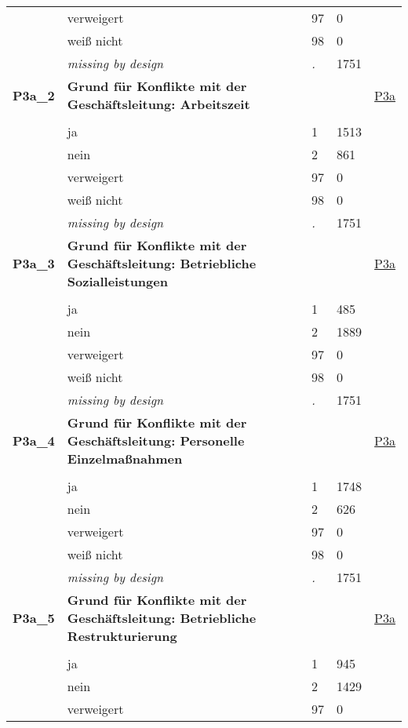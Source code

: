 \begin{longtable}{| L{2.65cm} | L{8cm} | C{1.5cm} | R{1.25cm} | C{2.25cm}  |}
   & verweigert & 97 & 0 &  \\ 
   & weiß nicht & 98 & 0 &  \\ 
   & \textit{missing by design} & \textit{.} & 1751 &  \\ 
   \midrule
\textbf{P3a\_2}\label{var:P3a:2} & \textbf{Grund für Konflikte mit der Geschäftsleitung: Arbeitszeit} &  &  & \hyperref[P3a]{P3a} \\ 
   &  &  &  &  \\ 
   & ja & 1 & 1513 &  \\ 
   & nein & 2 & 861 &  \\ 
   & verweigert & 97 & 0 &  \\ 
   & weiß nicht & 98 & 0 &  \\ 
   & \textit{missing by design} & \textit{.} & 1751 &  \\ 
   \midrule
\textbf{P3a\_3}\label{var:P3a:3} & \textbf{Grund für Konflikte mit der Geschäftsleitung: Betriebliche Sozialleistungen} &  &  & \hyperref[P3a]{P3a} \\ 
   &  &  &  &  \\ 
   & ja & 1 & 485 &  \\ 
   & nein & 2 & 1889 &  \\ 
   & verweigert & 97 & 0 &  \\ 
   & weiß nicht & 98 & 0 &  \\ 
   & \textit{missing by design} & \textit{.} & 1751 &  \\ 
   \midrule
\textbf{P3a\_4}\label{var:P3a:4} & \textbf{Grund für Konflikte mit der Geschäftsleitung: Personelle Einzelmaßnahmen} &  &  & \hyperref[P3a]{P3a} \\ 
   &  &  &  &  \\ 
   & ja & 1 & 1748 &  \\ 
   & nein & 2 & 626 &  \\ 
   & verweigert & 97 & 0 &  \\ 
   & weiß nicht & 98 & 0 &  \\ 
   & \textit{missing by design} & \textit{.} & 1751 &  \\ 
   \midrule
\textbf{P3a\_5}\label{var:P3a:5} & \textbf{Grund für Konflikte mit der Geschäftsleitung: Betriebliche Restrukturierung} &  &  & \hyperref[P3a]{P3a} \\ 
   &  &  &  &  \\ 
   & ja & 1 & 945 &  \\ 
   & nein & 2 & 1429 &  \\ 
   & verweigert & 97 & 0 &  \\ 

\end{longtable}
